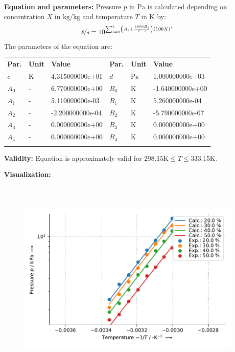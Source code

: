 \textbf{Equation and parameters:}
\newline
%
Pressure $p$ in $\si{\pascal}$ is calculated depending on concentration $X$ in $\si{\kilogram\per\kilogram}$ and  temperature $T$ in $\si{\kelvin}$ by:
%
\begin{equation*}
\nicefrac{p}{d} = 10 ^ { \sum_{i=0}^{4} \left( A_i + \frac{1000 B_i}{T - c} \right) \left( 100 X \right) ^{i}}
\end{equation*}
%
The parameters of the equation are:
%
\begin{longtable}[l]{lll|lll}
\toprule
\addlinespace
\textbf{Par.} & \textbf{Unit} & \textbf{Value} &	\textbf{Par.} & \textbf{Unit} & \textbf{Value} \\
\addlinespace
\midrule
\endhead

\bottomrule
\endfoot
\bottomrule
\endlastfoot
\addlinespace

$c$ & $\si{\kelvin}$ & 4.315000000e+01 & $d$ & $\si{\pascal}$ & 1.000000000e+03 \\
$A_0$ & - & 6.770000000e+00 & $B_0$ & $\si{\kelvin}$ & -1.640000000e+00 \\
$A_1$ & - & 5.110000000e-03 & $B_1$ & $\si{\kelvin}$ & 5.260000000e-04 \\
$A_2$ & - & -2.200000000e-04 & $B_2$ & $\si{\kelvin}$ & -5.790000000e-07 \\
$A_3$ & - & 0.000000000e+00 & $B_3$ & $\si{\kelvin}$ & 0.000000000e+00 \\
$A_4$ & - & 0.000000000e+00 & $B_4$ & $\si{\kelvin}$ & 0.000000000e+00 \\

\addlinespace\end{longtable}

\textbf{Validity:}
\newline
Equation is approximately valid for $298.15 \si{\kelvin} \leq T \leq 333.15 \si{\kelvin}$.
\newline

\textbf{Visualization:}
%
\begin{figure}[!htp]
{\noindent\includegraphics[height=10cm, keepaspectratio]{figs/abs/abs_Water_Libr_CH3CH(OH)COONa_ratio_2_1_Antoine_1.pdf}}
\end{figure}
%

